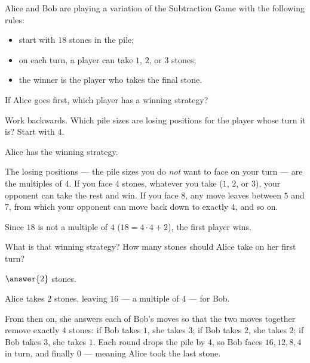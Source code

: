 \documentclass[12pt]{ximera}
\begin{document}
\begin{problem}
Alice and Bob are playing a variation of the Subtraction Game with the following
rules:
\begin{itemize}
\item start with $18$ stones in the pile;
\item on each turn, a player can take $1$, $2$, or $3$ stones;
\item the winner is the player who takes the final stone.
\end{itemize}

\begin{prompt}
If Alice goes first, which player has a winning strategy?

\begin{multipleChoice}
\end{multipleChoice}

\begin{hint}
Work backwards. Which pile sizes are losing positions for the player whose turn it
is? Start with $4$.
\end{hint}

\begin{feedback}
Alice has the winning strategy.

The losing positions --- the pile sizes you do \emph{not} want to face on your turn ---
are the multiples of $4$. If you face $4$ stones, whatever you take ($1$, $2$, or
$3$), your opponent can take the rest and win. If you face $8$, any move leaves
between $5$ and $7$, from which your opponent can move back down to exactly $4$, and
so on.

Since $18$ is not a multiple of $4$ ($18 = 4\cdot 4 + 2$), the first player wins.
\end{feedback}
\end{prompt}

\begin{prompt}
What is that winning strategy? How many stones should Alice take on her first turn?

$\answer{2}$ stones.

\begin{feedback}
Alice takes $2$ stones, leaving $16$ --- a multiple of $4$ --- for Bob.

From then on, she answers each of Bob's moves so that the two moves together remove
exactly $4$ stones: if Bob takes $1$, she takes $3$; if Bob takes $2$, she takes $2$;
if Bob takes $3$, she takes $1$. Each round drops the pile by $4$, so Bob faces
$16, 12, 8, 4$ in turn, and finally $0$ --- meaning Alice took the last stone.
\end{feedback}
\end{prompt}
\end{problem}
\end{document}

